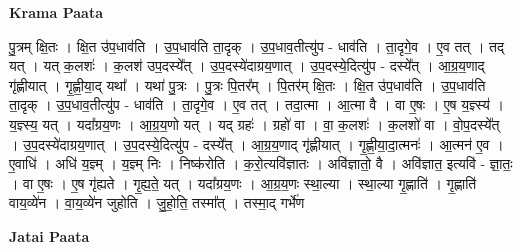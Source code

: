 \documentclass[17pt]{extarticle}
\begin{document}
\textbf{Krama Paata} \newline

पु॒त्रम् क्षि॒तः । क्षि॒त उ॑प॒धाव॑ति । उ॒प॒धाव॑ति ता॒दृक् । उ॒प॒धाव॒तीत्यु॑प - धाव॑ति । ता॒दृगे॒व । ए॒व तत् । तद् यत् । यत् क॒लशः॑ । क॒लश॑ उप॒दस्ये᳚त् । उ॒प॒दस्ये॑दाग्रय॒णात् । उ॒प॒दस्ये॒दित्यु॑प - दस्ये᳚त् । आ॒ग्र॒य॒णाद् गृ॑ह्णीयात् । गृ॒ह्णी॒या॒द् यथा᳚ । यथा॑ पु॒त्रः । पु॒त्रः पि॒तर᳚म् । पि॒तर॑म् क्षि॒तः । क्षि॒त उ॑प॒धाव॑ति । उ॒प॒धाव॑ति ता॒दृक् । उ॒प॒धाव॒तीत्यु॑प - धाव॑ति । ता॒दृगे॒व । ए॒व तत् । तदा॒त्मा । आ॒त्मा वै । वा ए॒षः । ए॒ष य॒ज्ञ्स्य॑ । य॒ज्ञ्स्य॒ यत् । यदा᳚ग्रय॒णः । आ॒ग्र॒य॒णो यत् । यद् ग्रहः॑ । ग्रहो॑ वा । वा॒ क॒लशः॑ । क॒लशो॑ वा । वो॒प॒दस्ये᳚त् । उ॒प॒दस्ये॑दाग्रय॒णात् । उ॒प॒दस्ये॒दित्यु॑प - दस्ये᳚त् । आ॒ग्र॒य॒णाद् गृ॑ह्णीयात् । गृ॒ह्णी॒या॒दा॒त्मनः॑ । आ॒त्मन॑ ए॒व । ए॒वाधि॑ । अधि॑ य॒ज्ञ्म् । य॒ज्ञ्म् निः । निष्क॑रोति । क॒रो॒त्यवि॑ज्ञातः । अवि॑ज्ञातो॒ वै । अवि॑ज्ञात॒ इत्यवि॑ - ज्ञा॒तः॒ । वा ए॒षः । ए॒ष गृ॑ह्यते । गृ॒ह्य॒ते॒ यत् । यदा᳚ग्रय॒णः । आ॒ग्र॒य॒णः स्था॒ल्या । स्था॒ल्या गृ॒ह्णाति॑ । गृ॒ह्णाति॑ वाय॒व्ये॑न । वा॒य॒व्ये॑न जुहोति । जु॒हो॒ति॒ तस्मा᳚त् । तस्मा॒द् गर्भे॑ण \newline

\textbf{Jatai Paata} \newline
\end{document}
